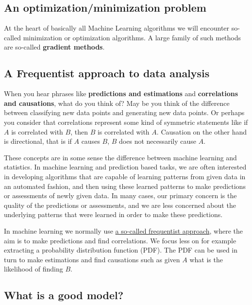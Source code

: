 \documentclass[%
oneside,                 %
final,                   %
10pt]{article}
\begin{document}
\noindent




\subsection{An optimization/minimization problem}

At the heart of basically all Machine Learning algorithms we will encounter so-called minimization or optimization algorithms. A large family of such methods are so-called \textbf{gradient methods}.

\subsection{A Frequentist approach to data analysis}

When you hear phrases like \textbf{predictions and estimations} and
\textbf{correlations and causations}, what do you think of?  May be you think
of the difference between classifying new data points and generating
new data points.
Or perhaps you consider that correlations represent some kind of symmetric statements like
if $A$ is correlated with $B$, then $B$ is correlated with
$A$. Causation on the other hand is directional, that is if $A$ causes $B$, $B$ does not
necessarily cause $A$.

These concepts are in some sense the difference between machine
learning and statistics. In machine learning and prediction based
tasks, we are often interested in developing algorithms that are
capable of learning patterns from given data in an automated fashion,
and then using these learned patterns to make predictions or
assessments of newly given data. In many cases, our primary concern
is the quality of the predictions or assessments, and we are less
concerned about the underlying patterns that were learned in order
to make these predictions.

In machine learning we normally use \href{{https://en.wikipedia.org/wiki/Frequentist_inference}}{a so-called frequentist approach},
where the aim is to make predictions and find correlations. We focus
less on for example extracting a probability distribution function (PDF). The PDF can be
used in turn to make estimations and find causations such as given $A$
what is the likelihood of finding $B$.


\subsection{What is a good model?}
\end{document}
